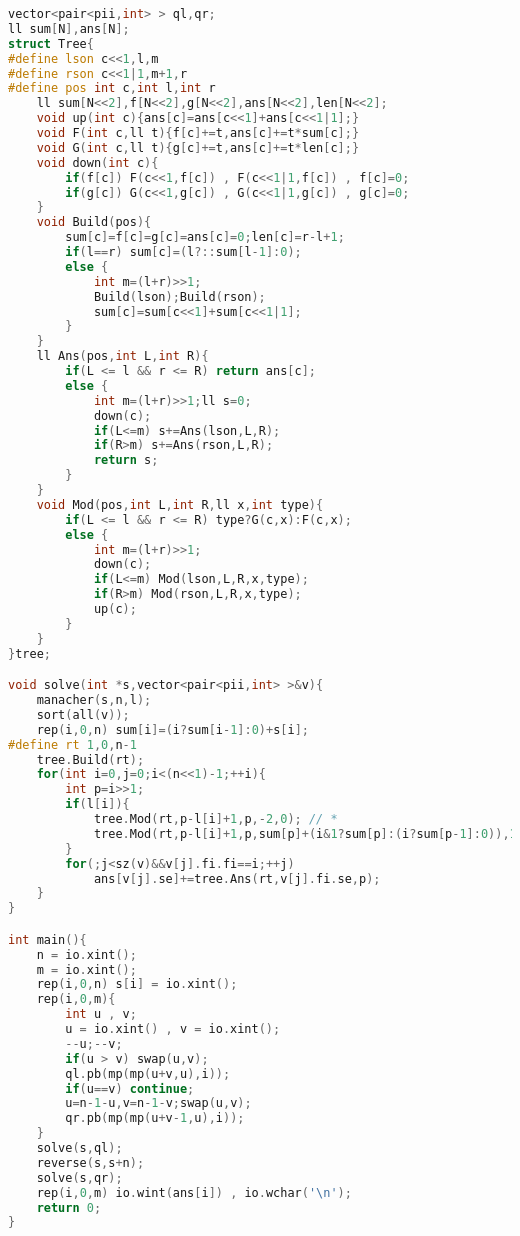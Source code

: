\begin{lstlisting}[language=C++]
vector<pair<pii,int> > ql,qr;
ll sum[N],ans[N];
struct Tree{
#define lson c<<1,l,m
#define rson c<<1|1,m+1,r
#define pos int c,int l,int r
    ll sum[N<<2],f[N<<2],g[N<<2],ans[N<<2],len[N<<2];
    void up(int c){ans[c]=ans[c<<1]+ans[c<<1|1];}
    void F(int c,ll t){f[c]+=t,ans[c]+=t*sum[c];}
    void G(int c,ll t){g[c]+=t,ans[c]+=t*len[c];}
    void down(int c){
        if(f[c]) F(c<<1,f[c]) , F(c<<1|1,f[c]) , f[c]=0;
        if(g[c]) G(c<<1,g[c]) , G(c<<1|1,g[c]) , g[c]=0;
    }
    void Build(pos){
        sum[c]=f[c]=g[c]=ans[c]=0;len[c]=r-l+1;
        if(l==r) sum[c]=(l?::sum[l-1]:0);
        else {
            int m=(l+r)>>1;
            Build(lson);Build(rson);
            sum[c]=sum[c<<1]+sum[c<<1|1];
        }
    }
    ll Ans(pos,int L,int R){
        if(L <= l && r <= R) return ans[c];
        else {
            int m=(l+r)>>1;ll s=0;
            down(c);
            if(L<=m) s+=Ans(lson,L,R);
            if(R>m) s+=Ans(rson,L,R);
            return s;
        }
    }
    void Mod(pos,int L,int R,ll x,int type){
        if(L <= l && r <= R) type?G(c,x):F(c,x);
        else {
            int m=(l+r)>>1;
            down(c);
            if(L<=m) Mod(lson,L,R,x,type);
            if(R>m) Mod(rson,L,R,x,type);
            up(c);
        }
    }
}tree;

void solve(int *s,vector<pair<pii,int> >&v){
    manacher(s,n,l);
    sort(all(v));
    rep(i,0,n) sum[i]=(i?sum[i-1]:0)+s[i];
#define rt 1,0,n-1
    tree.Build(rt);
    for(int i=0,j=0;i<(n<<1)-1;++i){
        int p=i>>1;
        if(l[i]){
            tree.Mod(rt,p-l[i]+1,p,-2,0); // *
            tree.Mod(rt,p-l[i]+1,p,sum[p]+(i&1?sum[p]:(i?sum[p-1]:0)),1); // +
        }
        for(;j<sz(v)&&v[j].fi.fi==i;++j)
            ans[v[j].se]+=tree.Ans(rt,v[j].fi.se,p);
    }
}

int main(){
    n = io.xint();
    m = io.xint();
    rep(i,0,n) s[i] = io.xint();
    rep(i,0,m){
        int u , v;
        u = io.xint() , v = io.xint();
        --u;--v;
        if(u > v) swap(u,v);
        ql.pb(mp(mp(u+v,u),i));
        if(u==v) continue;
        u=n-1-u,v=n-1-v;swap(u,v);
        qr.pb(mp(mp(u+v-1,u),i));
    }
    solve(s,ql);
    reverse(s,s+n);
    solve(s,qr);
    rep(i,0,m) io.wint(ans[i]) , io.wchar('\n');
    return 0;
}
\end{lstlisting}
